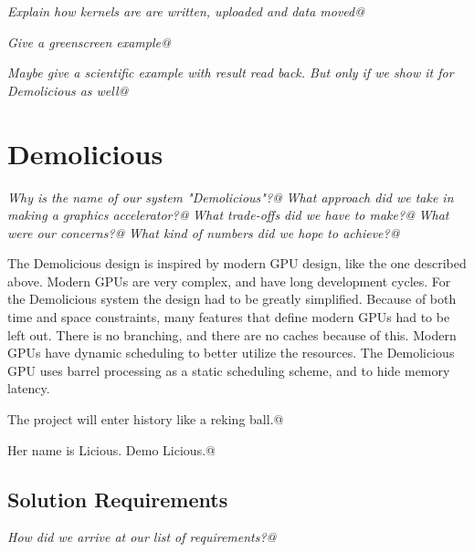 \documentclass[../main/report.tex]{subfiles}
\begin{document}
\emph{Explain how kernels are are written, uploaded and data moved@}

\emph{Give a greenscreen example@}

\emph{Maybe give a scientific example with result read back. But only if we show it for Demolicious as well@}


\section{Demolicious}

\textit{Why is the name of our system "Demolicious"?@}
\textit{What approach did we take in making a graphics accelerator?@}
\textit{What trade-offs did we have to make?@}
\textit{What were our concerns?@}
\textit{What kind of numbers did we hope to achieve?@}

The Demolicious design is inspired by modern GPU design, like the one described above.
Modern GPUs are very complex, and have long development cycles.
For the Demolicious system the design had to be greatly simplified.
Because of both time and space constraints, many features that define modern GPUs had to be left out.
There is no branching, and there are no caches because of this.
Modern GPUs have dynamic scheduling to better utilize the resources.
The Demolicious GPU uses barrel processing as a static scheduling scheme, and to hide memory latency.


The project will enter history like a reking ball.@

Her name is Licious. Demo Licious.@

\subsection{Solution Requirements}

\textit{How did we arrive at our list of requirements?@}
\end{document}
